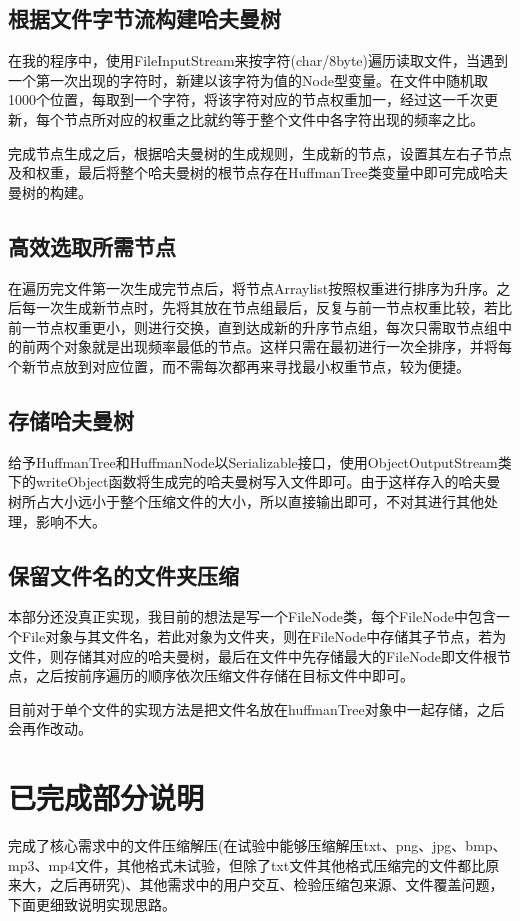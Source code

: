 \documentclass[11pt,a4paper]{article}
\begin{document}
\subsection*{根据文件字节流构建哈夫曼树}
\par{在我的程序中，使用FileInputStream来按字符(char/8byte)遍历读取文件，当遇到一个第一次出现的字符时，新建以该字符为值的Node型变量。在文件中随机取1000个位置，每取到一个字符，将该字符对应的节点权重加一，经过这一千次更新，每个节点所对应的权重之比就约等于整个文件中各字符出现的频率之比。}
\par{完成节点生成之后，根据哈夫曼树的生成规则，生成新的节点，设置其左右子节点及和权重，最后将整个哈夫曼树的根节点存在HuffmanTree类变量中即可完成哈夫曼树的构建。}
\subsection*{高效选取所需节点}
\par{在遍历完文件第一次生成完节点后，将节点Arraylist按照权重进行排序为升序。之后每一次生成新节点时，先将其放在节点组最后，反复与前一节点权重比较，若比前一节点权重更小，则进行交换，直到达成新的升序节点组，每次只需取节点组中的前两个对象就是出现频率最低的节点。这样只需在最初进行一次全排序，并将每个新节点放到对应位置，而不需每次都再来寻找最小权重节点，较为便捷。}
\subsection*{存储哈夫曼树}
\par{给予HuffmanTree和HuffmanNode以Serializable接口，使用ObjectOutputStream类下的writeObject函数将生成完的哈夫曼树写入文件即可。由于这样存入的哈夫曼树所占大小远小于整个压缩文件的大小，所以直接输出即可，不对其进行其他处理，影响不大。}
\subsection*{保留文件名的文件夹压缩}
\par{本部分还没真正实现，我目前的想法是写一个FileNode类，每个FileNode中包含一个File对象与其文件名，若此对象为文件夹，则在FileNode中存储其子节点，若为文件，则存储其对应的哈夫曼树，最后在文件中先存储最大的FileNode即文件根节点，之后按前序遍历的顺序依次压缩文件存储在目标文件中即可。}
\par{目前对于单个文件的实现方法是把文件名放在huffmanTree对象中一起存储，之后会再作改动。}
\section*{已完成部分说明}
\par{完成了核心需求中的文件压缩解压(在试验中能够压缩解压txt、png、jpg、bmp、mp3、mp4文件，其他格式未试验，但除了txt文件其他格式压缩完的文件都比原来大，之后再研究)、其他需求中的用户交互、检验压缩包来源、文件覆盖问题，下面更细致说明实现思路。}
\end{document}
